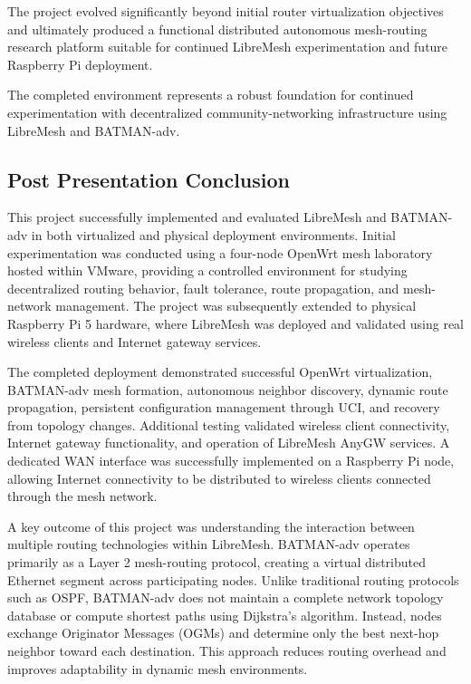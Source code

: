 \documentclass[conference]{IEEEtran}
\begin{document}
The project evolved significantly beyond initial router virtualization objectives and ultimately produced a functional distributed autonomous mesh-routing research platform suitable for continued LibreMesh experimentation and future Raspberry Pi deployment.

The completed environment represents a robust foundation for continued experimentation with decentralized community-networking infrastructure using LibreMesh and BATMAN-adv.

\subsection{Post Presentation Conclusion}

This project successfully implemented and evaluated LibreMesh and BATMAN-adv in both virtualized and physical deployment environments. Initial experimentation was conducted using a four-node OpenWrt mesh laboratory hosted within VMware, providing a controlled environment for studying decentralized routing behavior, fault tolerance, route propagation, and mesh-network management. The project was subsequently extended to physical Raspberry Pi 5 hardware, where LibreMesh was deployed and validated using real wireless clients and Internet gateway services.

The completed deployment demonstrated successful OpenWrt virtualization, BATMAN-adv mesh formation, autonomous neighbor discovery, dynamic route propagation, persistent configuration management through UCI, and recovery from topology changes. Additional testing validated wireless client connectivity, Internet gateway functionality, and operation of LibreMesh AnyGW services. A dedicated WAN interface was successfully implemented on a Raspberry Pi node, allowing Internet connectivity to be distributed to wireless clients connected through the mesh network.

A key outcome of this project was understanding the interaction between multiple routing technologies within LibreMesh. BATMAN-adv operates primarily as a Layer 2 mesh-routing protocol, creating a virtual distributed Ethernet segment across participating nodes. Unlike traditional routing protocols such as OSPF, BATMAN-adv does not maintain a complete network topology database or compute shortest paths using Dijkstra's algorithm. Instead, nodes exchange Originator Messages (OGMs) and determine only the best next-hop neighbor toward each destination. This approach reduces routing overhead and improves adaptability in dynamic mesh environments.
\end{document}
